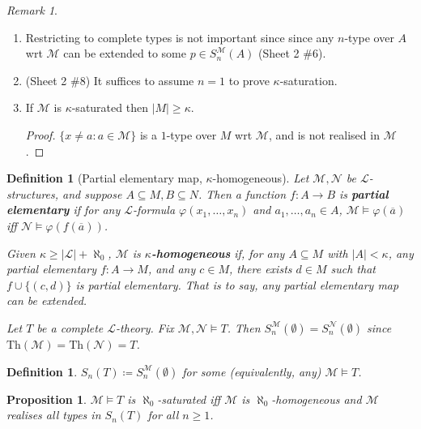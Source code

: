 \documentclass[]{article}
\theoremstyle{custhm}
\theoremstyle{cusdef}
\newtheorem{defin}[theorem]{Definition}
\theoremstyle{custhm}
\theoremstyle{custhm}
\theoremstyle{custhm}
\newtheorem{prop}[theorem]{Proposition}
\theoremstyle{ex}
\theoremstyle{custhm}
\theoremstyle{cusdef}
\theoremstyle{remark}
\theoremstyle{remark}
\newtheorem{remark}[theorem]{Remark}
\theoremstyle{numremark}
\newcommand{\ra}{\rightarrow}
\newcommand{\undf}[1]{\textit{\textbf{#1}}}
\renewcommand{\L}{\mathcal{L}}
\newcommand{\M}{\mathcal{M}}
\renewcommand{\phi}{\varphi}
\renewcommand{\bar}{\overline}
\newcommand{\Th}{\textrm{Th}}
\newcommand{\N}{\mathcal{N}}
\renewcommand{\subset}{\subseteq}
\begin{document}
\begin{remark}\ 
\begin{enumerate}[label = \alph*)]
	\item Restricting to complete types is not important since since any $n$-type over $A$ wrt $\M$ can be extended to some $p \in S_n^\M(A)$ (Sheet 2 \#6).
	\item (Sheet 2 \#8) It suffices to assume $n = 1$ to prove $\kappa$-saturation.
	\item If $\M$ is $\kappa$-saturated then $|M| \ge \kappa$.
	\begin{proof}
		$\{x \ne a:a\in \M\}$ is a $1$-type over $M$ wrt $\M$, and is not realised in $\M$.
	\end{proof}
\end{enumerate}
\end{remark}
\begin{defin}[Partial elementary map, $\kappa$-homogeneous]
Let $\M,\N$ be $\L$-structures, and suppose $A\subset M,B\subset N$. Then a function $f:A\ra B$ is \undf{partial elementary} if for any $\L$-formula $\phi(x_1,\dots,x_n)$ and $a_1,\dots,a_n\in A$, $\M\models \phi(\bar{a})$ iff $\N\models \phi(f(\bar{a}))$.

Given $\kappa\ge |\L| + \aleph_0$, $\M$ is \undf{$\kappa$-homogeneous} if, for any $A\subset M$ with $|A| < \kappa$, any partial elementary $f:A\ra M$, and any $c\in M$, there exists $d \in M$ such that $f\cup \{(c,d)\}$ is partial elementary. That is to say, any partial elementary map can be extended.

Let $T$ be a complete $\L$-theory. Fix $\M,\N\models T$. Then $S_n^\M(\emptyset) = S_n^\N(\emptyset)$ since $\Th(\M) = \Th(\N) = T$.
\end{defin}
\begin{defin}
$S_n(T) \coloneqq S_n^\M(\emptyset)$ for some (equivalently, any) $\M\models T$.
\end{defin}
\begin{prop}
$\M\models T$ is $\aleph_0$-saturated iff $\M$ is $\aleph_0$-homogeneous and $\M$ realises all types in $S_n(T)$ for all $n\ge 1$.
\end{prop}
\end{document}
